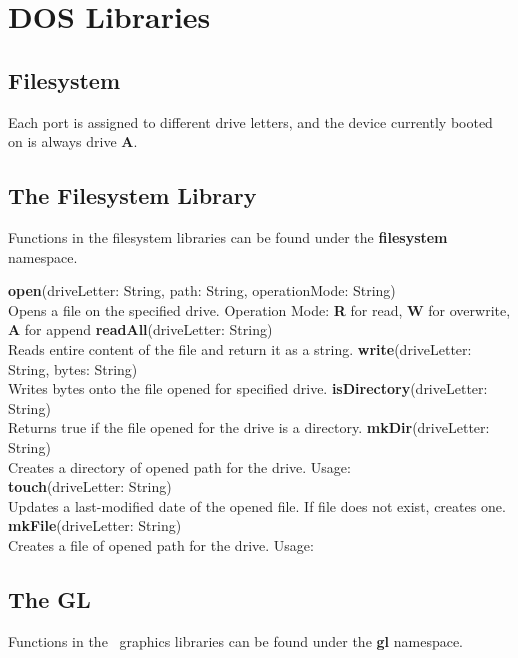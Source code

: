 \chapter{DOS Libraries}

\section{Filesystem}

Each port is assigned to different drive letters, and the device currently booted on is always drive \textbf{A}.

\section{The Filesystem Library}

Functions in the filesystem libraries can be found under the \textbf{filesystem} namespace.

\begin{outline}
\1\textbf{open}(driveLetter: String, path: String, operationMode: String)
\\Opens a file on the specified drive.
 \2Operation Mode: \textbf{R} for read, \textbf{W} for overwrite, \textbf{A} for append
\1\textbf{readAll}(driveLetter: String)
\\Reads entire content of the file and return it as a string.
\1\textbf{write}(driveLetter: String, bytes: String)
\\Writes bytes onto the file opened for specified drive.
\1\textbf{isDirectory}(driveLetter: String)
\\Returns true if the file opened for the drive is a directory.
\1\textbf{mkDir}(driveLetter: String)
\\Creates a directory of opened path for the drive. Usage:
\\
\1\textbf{touch}(driveLetter: String)
\\Updates a last-modified date of the opened file. If file does not exist, creates one.
\1\textbf{mkFile}(driveLetter: String)
\\Creates a file of opened path for the drive. Usage:
\\
\end{outline}


\section{The GL}

Functions in the \thedos\ graphics libraries can be found under the \textbf{gl} namespace.
